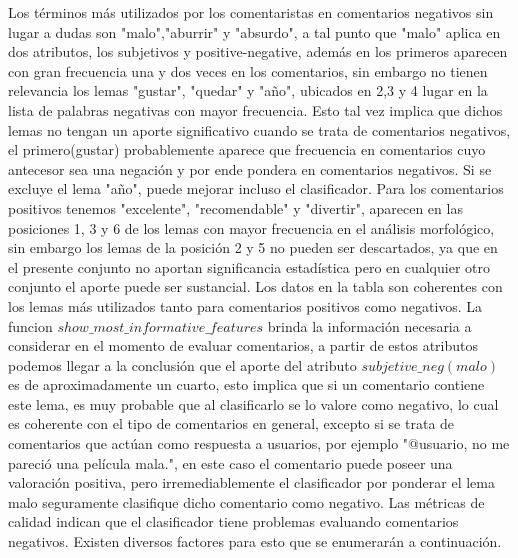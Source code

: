 \documentclass[12pt]{article}
\begin{document}
Los términos más utilizados por los comentaristas en comentarios negativos sin lugar a dudas son "malo","aburrir" y "absurdo", a tal punto que "malo" aplica en dos atributos, los subjetivos y positive-negative, además en los primeros aparecen con gran frecuencia una y dos veces en los comentarios, sin embargo no tienen relevancia los lemas "gustar", "quedar" y "año", ubicados en 2,3 y 4 lugar en la lista de palabras negativas con mayor frecuencia. Esto tal vez implica que dichos lemas no tengan un aporte significativo cuando se trata de comentarios negativos, el primero(gustar) probablemente aparece que frecuencia en comentarios cuyo antecesor sea una negación y por ende pondera en comentarios negativos. Si se excluye el lema "año", puede mejorar incluso el clasificador.
Para los comentarios positivos tenemos "excelente", "recomendable" y "divertir", aparecen en las posiciones 1, 3 y 6 de los lemas con mayor frecuencia en el análisis morfológico, sin embargo los lemas de la posición 2 y 5 no pueden ser descartados, ya que en el presente conjunto no aportan significancia estadística pero en cualquier otro conjunto el aporte puede ser sustancial.
Los datos en la tabla son coherentes con los lemas más utilizados tanto para comentarios positivos como negativos. La funcion $show\_most\_informative\_features$ brinda la información necesaria a considerar en el momento de evaluar comentarios, a partir de estos atributos podemos llegar a la conclusión que el aporte del atributo $subjetive\_neg(malo)$ es de aproximadamente un cuarto, esto implica que si un comentario contiene este lema, es muy probable que al clasificarlo se lo valore como negativo, lo cual es coherente con el tipo de comentarios en general, excepto si se trata de comentarios que actúan como respuesta a usuarios, por ejemplo "@usuario, no me pareció una película mala.", en este caso el comentario puede poseer una valoración positiva, pero irremediablemente el clasificador por ponderar el lema malo seguramente clasifique dicho comentario como negativo.
Las métricas de calidad indican que el clasificador tiene problemas evaluando comentarios negativos. Existen diversos factores para esto que se enumerarán a continuación.
\end{document}
